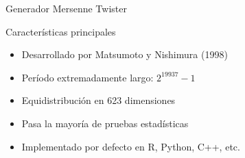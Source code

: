 \documentclass[aspectratio=169]{beamer}
\begin{document}
\begin{frame}{Generador Mersenne Twister}
    \begin{block}{Características principales}
        \begin{itemize}
            \item Desarrollado por Matsumoto y Nishimura (1998)
            \item Período extremadamente largo: $2^{19937}-1$
            \item Equidistribución en 623 dimensiones
            \item Pasa la mayoría de pruebas estadísticas
            \item Implementado por defecto en R, Python, C++, etc.
        \end{itemize}
    \end{block}
    
\end{frame}
\end{document}
